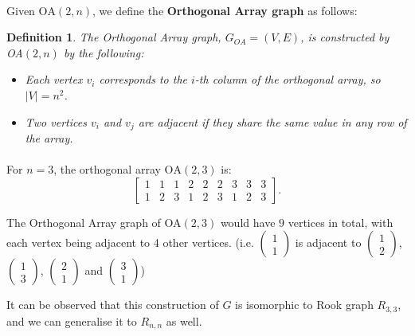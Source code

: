 \documentclass{article}
\newtheorem{definition}{Definition}
\begin{document}
\paragraph{}
Given \( \text{OA}(2, n) \), we define the \textbf{Orthogonal Array graph} as follows:

\begin{definition}
    The Orthogonal Array graph, \(G_{OA} = (V,E)\), is constructed by OA\((2,n)\) by the following:
    \begin{itemize}
        \item Each vertex \( v_i \) corresponds to the \( i \)-th column of the orthogonal array, so \( |V| = n^2 \).
        \item Two vertices \( v_i \) and \( v_j \) are adjacent if they share the same value in any row of the array.
    \end{itemize}
\end{definition}

\paragraph{}
For \( n = 3 \), the orthogonal array \( \text{OA}(2, 3) \) is:
\[
\begin{bmatrix}
1 & 1 & 1 & 2 & 2 & 2 & 3 & 3 & 3 \\
1 & 2 & 3 & 1 & 2 & 3 & 1 & 2 & 3
\end{bmatrix}.
\]


The Orthogonal Array graph of OA\((2, 3)\) would have $9$ vertices in total, with each vertex being adjacent to 4 other vertices.
(i.e. $\begin{pmatrix}
    1\\1
\end{pmatrix}$ is adjacent to $\begin{pmatrix}
    1\\2
\end{pmatrix}$, $\begin{pmatrix}
    1\\3
\end{pmatrix}$, $\begin{pmatrix}
    2\\1
\end{pmatrix}$ and $\begin{pmatrix}
    3\\1
\end{pmatrix}$)

It can be observed that this construction of \(G\) is isomorphic to Rook graph \(R_{3,3}\), and we can generalise it to \(R_{n,n}\) as well.
\end{document}
